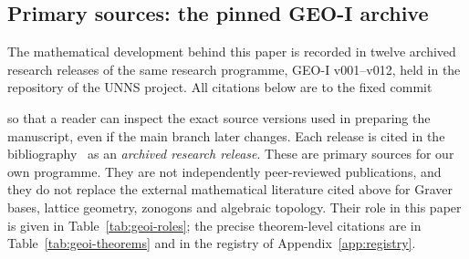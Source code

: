 \subsection{Primary sources: the pinned GEO-I archive}\label{sec:lit-archive}

The mathematical development behind this paper is recorded in twelve archived research releases of the same research programme, GEO-I v001--v012, held in the repository of the UNNS project. All citations below are to the fixed commit
\begin{center}\geoicommit\end{center}
so that a reader can inspect the exact source versions used in preparing the manuscript, even if the main branch later changes. Each release is cited in the bibliography~\cite{GEOIv001,GEOIv002,GEOIv003,GEOIv004,GEOIv005,GEOIv006,GEOIv007,GEOIv008,GEOIv009,GEOIv010,GEOIv011,GEOIv012} as an \emph{archived research release}. These are primary sources for our own programme. They are not independently peer-reviewed publications, and they do not replace the external mathematical literature cited above for Graver bases, lattice geometry, zonogons and algebraic topology. Their role in this paper is given in Table~\ref{tab:geoi-roles}; the precise theorem-level citations are in Table~\ref{tab:geoi-theorems} and in the registry of Appendix~\ref{app:registry}.


